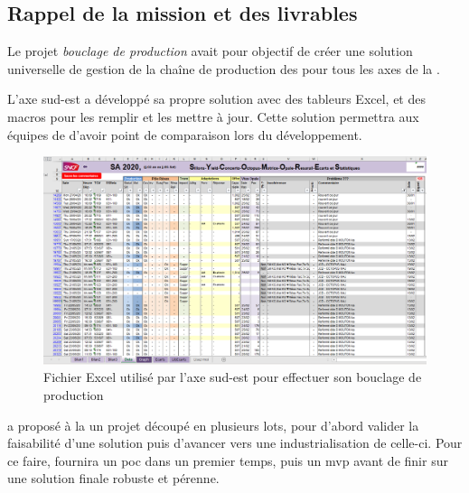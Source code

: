 \subsection{Rappel de la mission et des livrables}

Le projet \emph{bouclage de production} avait pour objectif de créer une solution universelle de gestion de la chaîne de production des \tgv pour tous les axes de la \sncf.

L'axe sud-est a développé sa propre solution avec des tableurs Excel, et des macros pour les remplir et les mettre à jour. Cette solution permettra aux équipes de \tnp d'avoir point de comparaison lors du développement.

\begin{figure}[H]
    \centering
    \includegraphics[width=1\linewidth]{img/data_bdp_sycomores.png}
    \caption{Fichier Excel utilisé par l'axe sud-est pour effectuer son bouclage de production}
\end{figure}

\damien a proposé à la \sncf un projet découpé en plusieurs lots, pour d'abord valider la faisabilité d'une solution puis d'avancer vers une industrialisation de celle-ci. Pour ce faire, \tnp fournira un \gls{poc} dans un premier temps, puis un \gls{mvp} avant de finir sur une solution finale robuste et pérenne.

